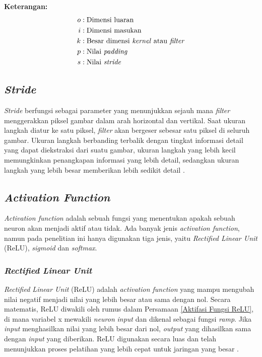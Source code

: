     \textbf{Keterangan:}
        \begin{align*}
        o & : \text{Dimensi luaran} \\
        i & : \text{Dimensi masukan} \\
        k & : \text{Besar dimensi \textit{kernel} atau \textit{filter}} \\
        p & : \text{Nilai \textit{padding}} \\
        s & : \text{Nilai \textit{stride}}
        \end{align*}
        


\subsection{\textit{Stride}}

    \textit{Stride} berfungsi sebagai parameter yang menunjukkan sejauh mana \textit{filter} menggerakkan piksel gambar dalam arah horizontal dan vertikal. Saat ukuran langkah diatur ke satu piksel, \textit{filter} akan bergeser sebesar satu piksel di seluruh gambar. Ukuran langkah berbanding terbalik dengan tingkat informasi detail yang dapat diekstraksi dari suatu gambar, ukuran langkah yang lebih kecil memungkinkan penangkapan informasi yang lebih detail, sedangkan ukuran langkah yang lebih besar memberikan lebih sedikit detail \cite{Dewi2018}.

\subsection{\textit{Activation Function}}

\textit{Activation function} adalah sebuah fungsi yang menentukan apakah sebuah neuron akan menjadi aktif atau tidak. Ada banyak jenis \textit{activation function}, namun pada penelitian ini hanya digunakan tiga jenis, yaitu \textit{Rectified Linear Unit} (ReLU), \textit{sigmoid }dan \textit{softmax}.



\subsubsection{\textit{Rectified Linear Unit}}
    \textit{Rectified Linear Unit} (ReLU) adalah \textit{activation function} yang mampu mengubah nilai negatif menjadi nilai yang lebih besar atau sama dengan nol. Secara matematis, ReLU diwakili oleh rumus dalam Persamaan \ref{Aktifasi Fungsi ReLU}, di mana variabel x mewakili \textit{neuron} \textit{input} dan dikenal sebagai fungsi \textit{ramp}. Jika \textit{input} menghasilkan nilai yang lebih besar dari nol, \textit{output} yang dihasilkan sama dengan \textit{input} yang diberikan. ReLU digunakan secara luas dan telah menunjukkan proses pelatihan yang lebih cepat untuk jaringan yang besar \cite{Dewi2018}.



